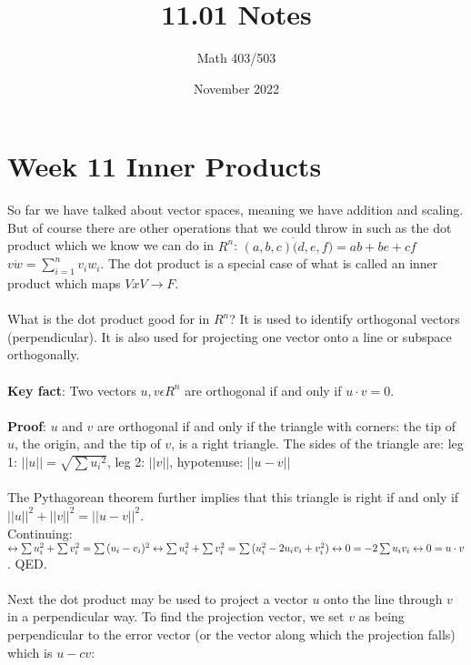 \documentclass{article}
\title{11.01 Notes}
\author{Math 403/503}
\date{November 2022}
\begin{document}
\maketitle

\section{Week 11 Inner Products}
So far we have talked about vector spaces, meaning we have addition and scaling. But of course there are other operations that we could throw in such as the dot product which we know we can do in $R^n$: $(a,b,c) \dot (d,e,f) = ab + be + cf$ \\
$v \dot w = \sum_{i=1}^{n} v_iw_i$. The dot product is a special case of what is called an inner product which maps $VxV \rightarrow F$. \\\\
What is the dot product good for in $R^n$? It is used to identify orthogonal vectors (perpendicular). It is also used for projecting one vector onto a line or subspace orthogonally. \\\\
\textbf{Key fact}: Two vectors $u, v \epsilon R^n$ are orthogonal if and only if $u \cdot v = 0$. \\\\
\textbf{Proof}: $u$ and $v$ are orthogonal if and only if the triangle with corners: the tip of $u$, the origin, and the tip of $v$, is a right triangle. The sides of the triangle are: leg 1: $||u|| = \sqrt{\sum{u_i}^2}$, leg 2: $||v||$, hypotenuse: $||u -v||$\\\\
The Pythagorean theorem further implies that this triangle is right if and only if $||u||^2 + ||v||^2 = ||u-v||^2$. \\ Continuing: $\leftrightarrow \sum{u_i^2} + \sum{v_i^2} = \sum{(u_i - v_i)^2} \\ \leftrightarrow \sum{u_i^2} + \sum{v_i^2} = \sum{(u_i^2 - 2u_iv_i + v_i^2)} \\ \leftrightarrow 0 = -2 \sum{u_iv_i} \\ \leftrightarrow 0 = u \cdot v$. QED.  \\\\
Next the dot product may be used to project a vector $u$ onto the line through $v$ in a perpendicular way. To find the projection vector, we set $v$ as being perpendicular to the error vector (or the vector along which the projection falls) which is $u-cv$: \\
\end{document}

